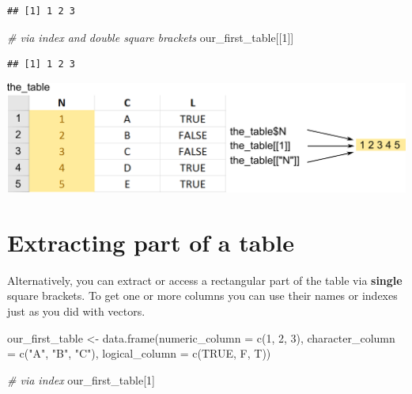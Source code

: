 \documentclass[
]{book}
\newenvironment{Shaded}{\begin{snugshade}}{\end{snugshade}}
\newcommand{\AttributeTok}[1]{\textcolor[rgb]{0.77,0.63,0.00}{#1}}
\newcommand{\CommentTok}[1]{\textcolor[rgb]{0.56,0.35,0.01}{\textit{#1}}}
\newcommand{\ConstantTok}[1]{\textcolor[rgb]{0.00,0.00,0.00}{#1}}
\newcommand{\DecValTok}[1]{\textcolor[rgb]{0.00,0.00,0.81}{#1}}
\newcommand{\FunctionTok}[1]{\textcolor[rgb]{0.00,0.00,0.00}{#1}}
\newcommand{\NormalTok}[1]{#1}
\newcommand{\OtherTok}[1]{\textcolor[rgb]{0.56,0.35,0.01}{#1}}
\newcommand{\StringTok}[1]{\textcolor[rgb]{0.31,0.60,0.02}{#1}}
\begin{document}
\begin{verbatim}
## [1] 1 2 3
\end{verbatim}

\begin{Shaded}
\begin{Highlighting}[]
\CommentTok{\# via index and double square brackets}
\NormalTok{our\_first\_table[[}\DecValTok{1}\NormalTok{]]}
\end{Highlighting}
\end{Shaded}

\begin{verbatim}
## [1] 1 2 3
\end{verbatim}

\begin{center}\includegraphics[width=1\linewidth]{images/table-column} \end{center}

\hypertarget{extracting-part-of-a-table}{%
\section{Extracting part of a table}\label{extracting-part-of-a-table}}

Alternatively, you can extract or access a rectangular part of the table via \textbf{single} square brackets. To get one or more columns you can use their names or indexes just as you did with vectors.

\begin{Shaded}
\begin{Highlighting}[]
\NormalTok{our\_first\_table }\OtherTok{\textless{}{-}} \FunctionTok{data.frame}\NormalTok{(}\AttributeTok{numeric\_column =} \FunctionTok{c}\NormalTok{(}\DecValTok{1}\NormalTok{, }\DecValTok{2}\NormalTok{, }\DecValTok{3}\NormalTok{), }
                              \AttributeTok{character\_column =} \FunctionTok{c}\NormalTok{(}\StringTok{"A"}\NormalTok{, }\StringTok{"B"}\NormalTok{, }\StringTok{"C"}\NormalTok{),}
                              \AttributeTok{logical\_column =} \FunctionTok{c}\NormalTok{(}\ConstantTok{TRUE}\NormalTok{, F, T))}

\CommentTok{\# via index}
\NormalTok{our\_first\_table[}\DecValTok{1}\NormalTok{]}
\end{Highlighting}
\end{Shaded}
\end{document}
